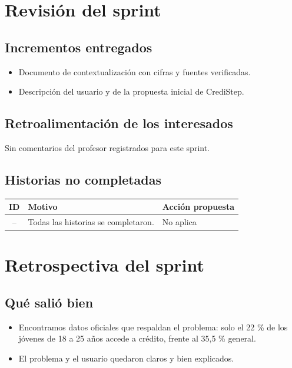 \documentclass[11pt,a4paper]{article}
\begin{document}
\section{Revisión del sprint}

\subsection{Incrementos entregados}
\begin{itemize}[leftmargin=1.5em]
  \item {Documento de contextualización con cifras y fuentes verificadas.}
  \item {Descripción del usuario y de la propuesta inicial de CrediStep.}
\end{itemize}

\subsection{Retroalimentación de los interesados}
{Sin comentarios del profesor registrados para este sprint.}

\subsection{Historias no completadas}
\begin{tabularx}{\textwidth}{c X X}
  \toprule
  \textbf{ID} & \textbf{Motivo} & \textbf{Acción propuesta} \\
  \midrule
  -- & Todas las historias se completaron. & No aplica \\
  \bottomrule
\end{tabularx}

\section{Retrospectiva del sprint}

\subsection{Qué salió bien}
\begin{itemize}[leftmargin=1.5em]
  \item {Encontramos datos oficiales que respaldan el problema: solo el 22 \% de los jóvenes de 18 a 25 años accede a crédito, frente al 35,5 \% general.}
  \item {El problema y el usuario quedaron claros y bien explicados.}
\end{itemize}
\end{document}
